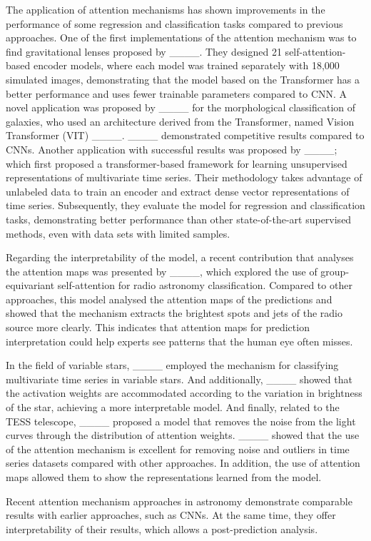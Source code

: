 The application of attention mechanisms has shown improvements in the performance of some regression and classification tasks compared to previous approaches. One of the first implementations of the attention mechanism was to find gravitational lenses proposed by ____. They designed 21 self-attention-based encoder models, where each model was trained separately with 18,000 simulated images, demonstrating that the model based on the Transformer has a better performance and uses fewer trainable parameters compared to CNN. A novel application was proposed by ____ for the morphological classification of galaxies, who used an architecture derived from the Transformer, named Vision Transformer (VIT) ____. ____ demonstrated competitive results compared to CNNs. Another application with successful results was proposed by ____; which first proposed a transformer-based framework for learning unsupervised representations of multivariate time series. Their methodology takes advantage of unlabeled data to train an encoder and extract dense vector representations of time series. Subsequently, they evaluate the model for regression and classification tasks, demonstrating better performance than other state-of-the-art supervised methods, even with data sets with limited samples.

Regarding the interpretability of the model, a recent contribution that analyses the attention maps was presented by ____, which explored the use of group-equivariant self-attention for radio astronomy classification. Compared to other approaches, this model analysed the attention maps of the predictions and showed that the mechanism extracts the brightest spots and jets of the radio source more clearly. This indicates that attention maps for prediction interpretation could help experts see patterns that the human eye often misses. \par

In the field of variable stars, ____ employed the mechanism for classifying multivariate time series in variable stars. And additionally, ____ showed that the activation weights are accommodated according to the variation in brightness of the star, achieving a more interpretable model. And finally, related to the TESS telescope, ____ proposed a model that removes the noise from the light curves through the distribution of attention weights. ____ showed that the use of the attention mechanism is excellent for removing noise and outliers in time series datasets compared with other approaches. In addition, the use of attention maps allowed them to show the representations learned from the model. \par

Recent attention mechanism approaches in astronomy demonstrate comparable results with earlier approaches, such as CNNs. At the same time, they offer interpretability of their results, which allows a post-prediction analysis. \par